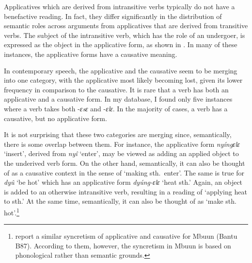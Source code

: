 
Applicatives which are derived from intransitive verbs typically do not have a benefactive reading. In fact, they differ significantly in the distribution of semantic roles across arguments from applicatives that are derived from transitive verbs. The subject of the intransitive verb, which has the role of an undergoer, is expressed as the object in the applicative form, as shown in . In many of these instances, the applicative forms have a causative meaning.


In contemporary speech, the applicative and the causative seem to be merging into one category, with the applicative most likely becoming lost, given its lower frequency in comparison to the causative.  It is rare that a verb has both an applicative and a causative form. In my database, I  found only five instances where a verb takes both -{\itshape ɛsɛ} and -{\itshape ɛlɛ}. In the majority of cases, a verb has a causative, but no applicative form.


It is not surprising that these two categories are merging since, semantically, there is some overlap between them. For instance, the applicative form {\itshape nyíngɛlɛ} `insert', derived from {\itshape nyî} `enter',  may be viewed as adding an applied object to the underived verb form. On the other hand, semantically, it can also be thought of as a causative context in the sense of `making sth.\ enter'. The same is true for {\itshape dyû} `be hot' which has an applicative form {\itshape dyúng-ɛlɛ} `heat sth.' Again, an object is added to an otherwise intransitive verb, resulting in a reading of `applying heat to sth.' At the same time, semantically, it can also be thought of as `make sth. hot'.\footnote{\citet{bostoen2011} report a similar syncretism of applicative and causative for Mbuun (Bantu B87). According to them, however, the syncretism in Mbuun is based on phonological rather than semantic grounds.}


